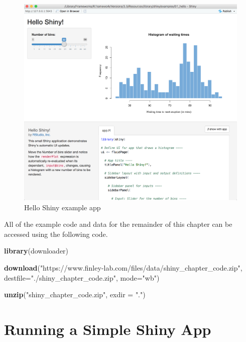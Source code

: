 \documentclass[
]{krantz}
\makeatletter
\newenvironment{Shaded}{\begin{snugshade}}{\end{snugshade}}
\newcommand{\DataTypeTok}[1]{\textcolor[rgb]{0.27,0.27,0.27}{#1}}
\newcommand{\KeywordTok}[1]{\textcolor[rgb]{0.27,0.27,0.27}{\textbf{#1}}}
\newcommand{\NormalTok}[1]{#1}
\newcommand{\StringTok}[1]{\textcolor[rgb]{0.5,0.5,0.5}{#1}}
\newenvironment{kframe}{%
\medskip{}
\setlength{\fboxsep}{.8em}
 \def\at@end@of@kframe{}%
 \ifinner\ifhmode%
  \def\at@end@of@kframe{\end{minipage}}%
  \begin{minipage}{\columnwidth}%
 \fi\fi%
 \def\FrameCommand##1{\hskip\@totalleftmargin \hskip-\fboxsep
 \colorbox{shadecolor}{##1}\hskip-\fboxsep
     \hskip-\linewidth \hskip-\@totalleftmargin \hskip\columnwidth}%
 \MakeFramed {\advance\hsize-\width
   \@totalleftmargin\z@ \linewidth\hsize
   \@setminipage}}%
 {\par\unskip\endMakeFramed%
 \at@end@of@kframe}
\renewenvironment{Shaded}{\begin{kframe}}{\end{kframe}}
\makeatother
\begin{document}
\begin{figure}
\includegraphics[width=1\linewidth]{../../figures/hello_shiny} \caption{Hello Shiny example app}\label{fig:hello}
\end{figure}

All of the example code and data for the remainder of this chapter can be accessed using the following code.

\begin{Shaded}
\begin{Highlighting}[]
\KeywordTok{library}\NormalTok{(downloader)}

\KeywordTok{download}\NormalTok{(}\StringTok{"https://www.finley{-}lab.com/files/data/shiny\_chapter\_code.zip"}\NormalTok{, }
         \DataTypeTok{destfile=}\StringTok{"./shiny\_chapter\_code.zip"}\NormalTok{, }\DataTypeTok{mode=}\StringTok{"wb"}\NormalTok{)}

\KeywordTok{unzip}\NormalTok{(}\StringTok{"shiny\_chapter\_code.zip"}\NormalTok{, }\DataTypeTok{exdir =} \StringTok{"."}\NormalTok{)}
\end{Highlighting}
\end{Shaded}

\hypertarget{running-a-simple-shiny-app}{%
\section{Running a Simple Shiny App}\label{running-a-simple-shiny-app}}
\end{document}
